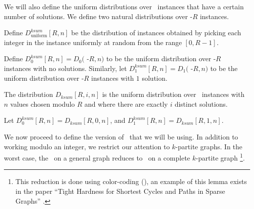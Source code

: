 We will also define the uniform distributions over \kSum~instances that have a certain number of solutions. 
We define two natural distributions over \kSum-$R$ instances.

\begin{definition}
Define $D^{ksum}_{\textrm{uniform}}[R,n]$ be the distribution of instances obtained by picking each integer in the instance uniformly at random from the range $[0,R-1]$.

Define $D^{ksum}_{0}[R,n] = D_0($ \kSum-$R, n)$ to be the uniform distribution over \kSum-$R$ instances with no solutions. Similarly, let $D^{ksum}_{1}[R,n] = D_1($ \kSum-$R, n)$ to be the uniform distribution over \kSum-$R$ instances with $1$ solution.

The distribution $D_{ksum}[R,i,n]$ is the uniform distribution over \kSum~instances with $n$ values chosen modulo $R$ and where there are exactly $i$ distinct solutions. 

Let $D^{ksum}_{0}[R,n] = D_{ksum}[R, 0, n]$, and $D^{ksum}_{1}[R,n] = D_{ksum}[R, 1, n]$.
\end{definition}


%

We now proceed to define the version of \zkclique~that we will be using. In addition to working modulo an integer, we restrict our attention to $k$-partite graphs. In the worst case, the \zkclique~on a general graph reduces to \zkclique~on a complete $k$-partite graph \footnote{This reduction is done using color-coding (\cite{colorcoding}), an example of this lemma exists in the paper ``Tight Hardness for Shortest Cycles and Paths in Sparse Graphs'' \cite{sparseGraphsLVWW}.}\cite{colorcoding}. 



